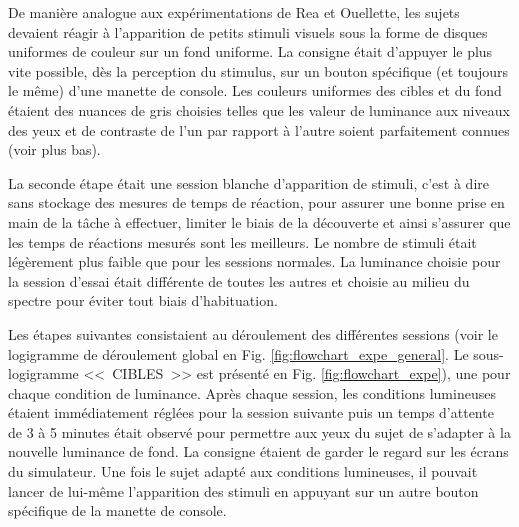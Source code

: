	\par De manière analogue aux expérimentations de Rea et Ouellette, les sujets devaient réagir à l'apparition de petits stimuli visuels sous la forme de disques uniformes de couleur sur un fond uniforme. La consigne était d'appuyer le plus vite possible, dès la perception du stimulus, sur un bouton spécifique (et toujours le même) d'une manette de console. Les couleurs uniformes des cibles et du fond étaient des nuances de gris choisies telles que les valeur de luminance aux niveaux des yeux et de contraste de l'un par rapport à l'autre soient parfaitement connues (voir plus bas).
	
	\par La seconde étape était une session blanche d'apparition de stimuli, c'est à dire sans stockage des mesures de temps de réaction, pour assurer une bonne prise en main de la tâche à effectuer, limiter le biais de la découverte et ainsi s'assurer que les temps de réactions mesurés sont les meilleurs. Le nombre de stimuli était légèrement plus faible que pour les sessions normales. La luminance choisie pour la session d'essai était différente de toutes les autres et choisie au milieu du spectre pour éviter tout biais d'habituation.
	
	\par Les étapes suivantes consistaient au déroulement des différentes sessions (voir le logigramme de déroulement global en Fig. \ref{fig:flowchart_expe_general}. Le sous-logigramme <<~CIBLES~>> est présenté en Fig. \ref{fig:flowchart_expe}), une pour chaque condition de luminance. Après chaque session, les conditions lumineuses étaient immédiatement réglées pour la session suivante puis un temps d'attente de 3 à 5 minutes était observé pour permettre aux yeux du sujet de s'adapter à la nouvelle luminance de fond. La consigne étaient de garder le regard sur les écrans du simulateur. Une fois le sujet adapté aux conditions lumineuses, il pouvait lancer de lui-même l'apparition des stimuli en appuyant sur un autre bouton spécifique de la manette de console.
	
